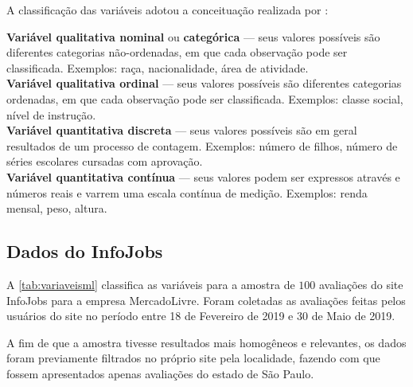     A classificação das variáveis adotou a conceituação realizada por :
	
	\begin{citacao}
		\textbf{Variável qualitativa nominal} ou \textbf{categórica} --- seus valores possíveis são diferentes categorias não-ordenadas, em que cada observação pode ser classificada. Exemplos: raça, nacionalidade, área de atividade. \\
		\textbf{Variável qualitativa ordinal} --- seus valores possíveis são diferentes categorias ordenadas, em que cada observação pode ser classificada. Exemplos: classe social, nível de instrução. \\
		\textbf{Variável quantitativa discreta} --- seus valores possíveis são em geral resultados de um processo de contagem. Exemplos: número de filhos, número de séries escolares cursadas com aprovação. \\
		\textbf{Variável quantitativa contínua} --- seus valores podem ser expressos através e números reais e varrem uma escala contínua de medição. Exemplos: renda mensal, peso, altura.
	\end{citacao}
	
	\subsection{Dados do InfoJobs}
	
	A \autoref{tab:variaveisml} classifica as variáveis para a amostra de $100$ avaliações do site InfoJobs para a empresa MercadoLivre. Foram coletadas as avaliações feitas pelos usuários do site no período entre 18 de Fevereiro de 2019 e 30 de Maio de 2019.
	
    A fim de que a amostra tivesse resultados mais homogêneos e relevantes, os dados foram previamente filtrados no próprio site pela localidade, fazendo com que fossem apresentados apenas avaliações do estado de São Paulo. 
	
